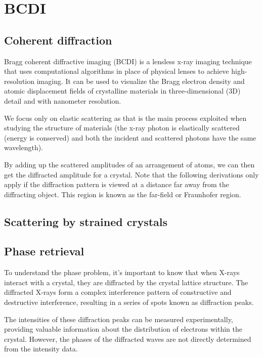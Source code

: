 \section{BCDI} \label{BCDI}

\subsection{Coherent diffraction}

Bragg coherent diffractive imaging (BCDI) is a lensless x-ray imaging technique that uses computational algorithms in place of physical lenses to achieve high-resolution imaging. It can be used to visualize the Bragg electron density and atomic displacement fields of crystalline materials in three-dimensional (3D) detail and with nanometer resolution.

We focus only on elastic scattering as that is the main process exploited when studying the structure of materials (the x-ray photon is elastically scattered (energy is conserved) and both the incident and scattered photons have the same wavelength).

By adding up the scattered amplitudes of an arrangement of atoms, we can then get the diffracted amplitude for a crystal. Note that the following derivations only apply if the diffraction pattern is viewed at a distance far away from the diffracting object. This region is known as the far-field or Fraunhofer region.

\subsection{Scattering by strained crystals}


\subsection{Phase retrieval}

To understand the phase problem, it's important to know that when X-rays interact with a crystal, they are diffracted by the crystal lattice structure. The diffracted X-rays form a complex interference pattern of constructive and destructive interference, resulting in a series of spots known as diffraction peaks.

The intensities of these diffraction peaks can be measured experimentally, providing valuable information about the distribution of electrons within the crystal. However, the phases of the diffracted waves are not directly determined from the intensity data.

